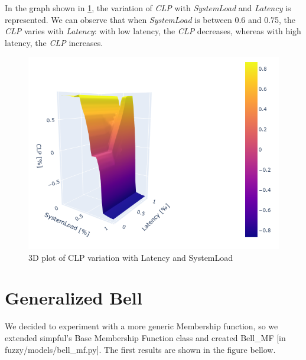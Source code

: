 \documentclass[titlepage]{article}
\begin{document}
In the graph shown in \cref{fig:3d_latency_triangular_v4}, the variation of \textit{CLP} with \textit{SystemLoad} and \textit{Latency} is represented. We can observe that when \textit{SystemLoad} is between 0.6 and 0.75, the \textit{CLP} varies with \textit{Latency}: with low latency, the \textit{CLP} decreases, whereas with high latency, the \textit{CLP} increases.

\begin{figure}[H]
    \centering
\includegraphics[scale = 0.6]{../images/3d_triangular_v4_latency}
\caption{3D plot of CLP variation with Latency and SystemLoad}
\label{fig:3d_latency_triangular_v4}
\end{figure}

\vspace{8mm}






\section{Generalized Bell}
We decided to experiment with a more generic Membership function, so we
extended simpful's Base Membership Function class and created Bell\_MF [in fuzzy/models/bell\_mf.py].
The first results are shown in the figure bellow.
\end{document}
